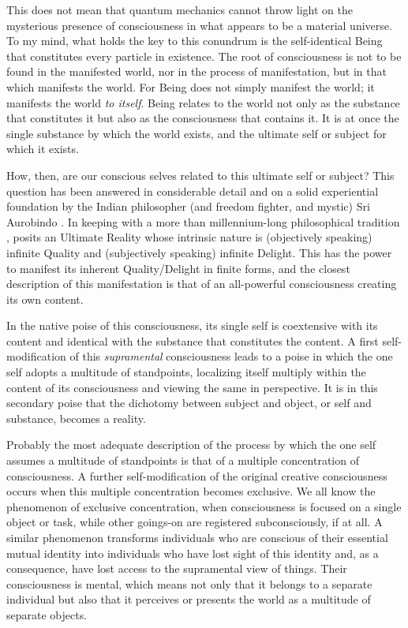 This does not mean that quantum mechanics cannot throw light on the mysterious presence of consciousness in what appears to be a material universe. To my mind, what holds the key to this conundrum is the self-identical Being that constitutes every particle in existence. The root of consciousness is not to be found in the manifested world, nor in the process of manifestation, but in that which manifests the world. For Being does not simply manifest the world; it manifests the world \emph{to itself}. Being relates to the world not only as the substance that constitutes it but also as the consciousness that contains it. It is at once the single substance by which the world exists, and the ultimate self or subject for which it exists.

 How, then, are our conscious selves related to this ultimate self or subject? This question has been answered in considerable detail and on a solid experiential foundation by the Indian philosopher (and freedom fighter, and mystic) Sri Aurobindo \citep{Heehs}. In keeping with a more than millennium-long philosophical tradition \citep{Phillips}, \citet{SA5} posits an Ultimate Reality whose intrinsic nature is (objectively speaking) infinite Quality and (subjectively speaking) infinite Delight. This has the power to manifest its inherent Quality/Delight in finite forms, and the closest description of this manifestation is that of an all-powerful consciousness creating its own content.

In the native poise of this consciousness, its single self is coextensive with its content and identical with the substance that constitutes the content. A first self-modification of this \emph{supramental} consciousness leads to a poise in which the one self adopts a multitude of standpoints, localizing itself multiply within the content of its consciousness and viewing the same in perspective. It is in this secondary poise that the dichotomy between subject and object, or self and substance, becomes a reality. 

Probably the most adequate description of the process by which the one self assumes a multitude of standpoints is that of a multiple concentration of consciousness. A further self-modification of the original creative consciousness occurs when this multiple concentration becomes exclusive. We all know the phenomenon of exclusive concentration, when consciousness is focused on a single object or task, while other goings-on are registered subconsciously, if at all. A similar phenomenon transforms individuals who are conscious of their essential mutual identity into individuals who have lost sight of this identity and, as a consequence, have lost access to the supramental view of things. Their consciousness is mental, which means not only that it belongs to a separate individual but also that it perceives or presents the world as a multitude of separate objects.

